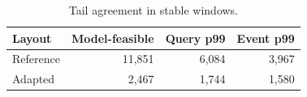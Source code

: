 \begin{table}[t]
\centering\small
\caption{Tail agreement in stable windows.}
\label{tab:agreement}
\begin{tabular}{@{}lrrr@{}}\toprule
Layout & Model-feasible & Query p99 & Event p99 \\
\midrule
Reference & 11,851 & 6,084 & 3,967 \\
Adapted & 2,467 & 1,744 & 1,580 \\
\bottomrule\end{tabular}
\end{table}
